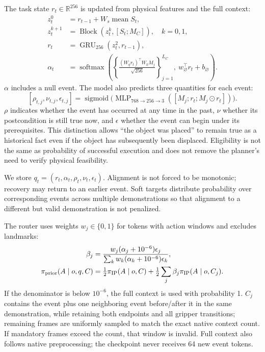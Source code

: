 \documentclass[
  10pt,
]{article}
\begin{document}
The task state \(r_t\in\mathbb R^{256}\) is updated from physical features and the full context:
\begin{equation}\label{eq:taskmemory}
\begin{aligned}
z_t^0&=r_{t-1}+W_s\operatorname{mean}S_t,\\
z_t^{k+1}&=\operatorname{Block}(z_t^k,[S_t;M_C]),\quad k=0,1,\\
r_t&=\operatorname{GRU}_{256}(z_t^2,r_{t-1}),\\
\alpha_t&=\operatorname{softmax}\left(\left\{\frac{(W_qr_t)^\top W_kM_j}{\sqrt{256}}\right\}_{j=1}^{L_C},\ w_\varnothing^\top r_t+b_\varnothing\right).
\end{aligned}
\end{equation}
\(\alpha\) includes a null event. The model also predicts three quantities for each event:
\begin{equation}\label{eq:eventheads}
[\rho_{t,j},\nu_{t,j},\epsilon_{t,j}]=\operatorname{sigmoid}\bigl(\operatorname{MLP}_{768\to256\to3}([M_j;r_t;M_j\odot r_t])\bigr).
\end{equation}
\(\rho\) indicates whether the event has occurred at any time in the past, \(\nu\) whether its postcondition is still true now, and \(\epsilon\) whether the event can begin under its prerequisites. This distinction allows ``the object was placed'' to remain true as a historical fact even if the object has subsequently been displaced. Eligibility is not the same as probability of successful execution and does not remove the planner's need to verify physical feasibility.

We store \(q_t=(r_t,\alpha_t,\rho_t,\nu_t,\epsilon_t)\). Alignment is not forced to be monotonic; recovery may return to an earlier event. Soft targets distribute probability over corresponding events across multiple demonstrations so that alignment to a different but valid demonstration is not penalized.

The router uses weights \(w_j\in\{0,1\}\) for tokens with action windows and excludes landmarks:
\begin{equation}\label{eq:router}
\begin{aligned}
\beta_j&=\frac{w_j(\alpha_j+10^{-6})\epsilon_j}{\sum_k w_k(\alpha_k+10^{-6})\epsilon_k},\\
\pi_{\rm prior}(A\mid o,q,C)&=\tfrac12\pi_{\rm IP}(A\mid o,C)+\tfrac12\sum_j\beta_j\pi_{\rm IP}(A\mid o,C_j).
\end{aligned}
\end{equation}
If the denominator is below \(10^{-6}\), the full context is used with probability 1. \(C_j\) contains the event plus one neighboring event before/after it in the same demonstration, while retaining both endpoints and all gripper transitions; remaining frames are uniformly sampled to match the exact native context count. If mandatory frames exceed the count, that window is invalid. Full context also follows native preprocessing; the checkpoint never receives 64 new event tokens.
\end{document}
